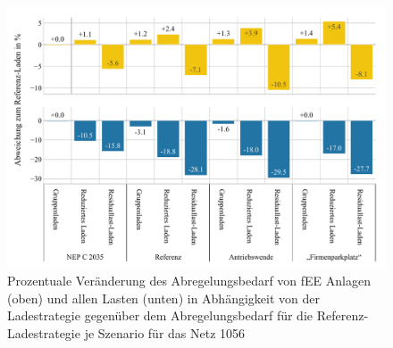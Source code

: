 \begin{figure}[H]
    \centering
    \includegraphics[width=\textwidth]{Bilder/1056_fee_load_cur-MA}
    \caption{Prozentuale Veränderung des Abregelungsbedarf von fEE Anlagen (oben) und allen Lasten (unten) in Abhängigkeit von der Ladestrategie gegenüber dem Abregelungsbedarf für die Referenz-Ladestrategie je Szenario für das Netz \num{1056}}\label{fig:1056_diff_cur}
\end{figure}